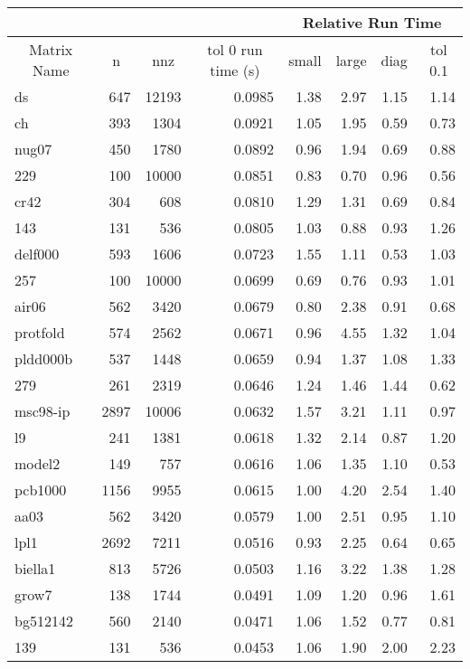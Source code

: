 \documentclass[10pt]{article}
\begin{document}
\begin{longtable}{|l|r|r|r|r|r|r|r|}
\hline	
& & & & \multicolumn{4}{c|}{Relative Run Time}  \\ \hline
\multicolumn{1}{|c|}{Matrix Name}	& \multicolumn{1}{c|}{n} & \multicolumn{1}{c|}{nnz} & \multicolumn{1}{c|}{tol 0 run time (s)} & \multicolumn{1}{c|}{small} & \multicolumn{1}{c|}{large} & \multicolumn{1}{c|}{diag} & \multicolumn{1}{c|}{tol 0.1} \\  \hline \endhead
ds	&	647	&	12193	&	0.0985	&	1.38	&	2.97	&	1.15	&	1.14	\\
ch	&	393	&	1304	&	0.0921	&	1.05	&	1.95	&	0.59	&	0.73	\\
nug07	&	450	&	1780	&	0.0892	&	0.96	&	1.94	&	0.69	&	0.88	\\
229	&	100	&	10000	&	0.0851	&	0.83	&	0.70	&	0.96	&	0.56	\\
cr42	&	304	&	608	&	0.0810	&	1.29	&	1.31	&	0.69	&	0.84	\\
143	&	131	&	536	&	0.0805	&	1.03	&	0.88	&	0.93	&	1.26	\\
delf000	&	593	&	1606	&	0.0723	&	1.55	&	1.11	&	0.53	&	1.03	\\
257	&	100	&	10000	&	0.0699	&	0.69	&	0.76	&	0.93	&	1.01	\\
air06	&	562	&	3420	&	0.0679	&	0.80	&	2.38	&	0.91	&	0.68	\\
protfold	&	574	&	2562	&	0.0671	&	0.96	&	4.55	&	1.32	&	1.04	\\
pldd000b	&	537	&	1448	&	0.0659	&	0.94	&	1.37	&	1.08	&	1.33	\\
279	&	261	&	2319	&	0.0646	&	1.24	&	1.46	&	1.44	&	0.62	\\
msc98-ip	&	2897	&	10006	&	0.0632	&	1.57	&	3.21	&	1.11	&	0.97	\\
l9	&	241	&	1381	&	0.0618	&	1.32	&	2.14	&	0.87	&	1.20	\\
model2	&	149	&	757	&	0.0616	&	1.06	&	1.35	&	1.10	&	0.53	\\
pcb1000	&	1156	&	9955	&	0.0615	&	1.00	&	4.20	&	2.54	&	1.40	\\
aa03	&	562	&	3420	&	0.0579	&	1.00	&	2.51	&	0.95	&	1.10	\\
lpl1	&	2692	&	7211	&	0.0516	&	0.93	&	2.25	&	0.64	&	0.65	\\
biella1	&	813	&	5726	&	0.0503	&	1.16	&	3.22	&	1.38	&	1.28	\\
grow7	&	138	&	1744	&	0.0491	&	1.09	&	1.20	&	0.96	&	1.61	\\
bg512142	&	560	&	2140	&	0.0471	&	1.06	&	1.52	&	0.77	&	0.81	\\
139	&	131	&	536	&	0.0453	&	1.06	&	1.90	&	2.00	&	2.23	\\

\end{longtable}
\end{document}
